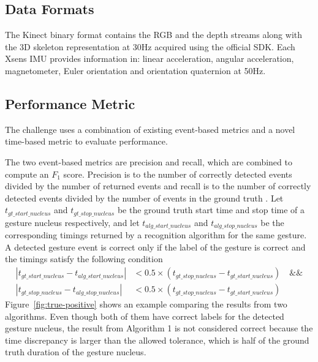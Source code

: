 \subsection{Data Formats}
The Kinect binary format contains the RGB and the depth streams along with the
3D skeleton representation at 30Hz acquired using the official SDK. Each Xsens IMU
provides information in: linear acceleration, angular acceleration,
magnetometer, Euler orientation and orientation quaternion at 50Hz.

\subsection{Performance Metric}\label{sec:chairgest-metric}
The challenge uses a combination of existing event-based metrics and a novel
time-based metric to evaluate performance. 

The two event-based metrics are
precision and recall, which are combined to compute an $F_1$ score. Precision is
to the number of correctly detected events divided by the number of returned events and recall 
is to the number of correctly detected events divided by the number of
events in the ground truth \cite{Ruffieux2013}. Let
$t_{gt\_start\_nucleus}$ and $t_{gt\_stop\_nucleus}$ be the ground truth start time and stop time of a gesture nucleus respectively,
and let $t_{alg\_start\_nucleus}$ and $t_{alg\_stop\_nucleus}$ be the
corresponding timings returned by a recognition algorithm for the same gesture.
A detected gesture event is correct only if the label of the gesture is
correct and the timings satisfy the following condition
\begin{align*}
|t_{gt\_start\_nucleus} - t_{alg\_start\_nucleus}| &< 0.5\times
(t_{gt\_stop\_nucleus} - t_{gt\_start\_nucleus}) \quad \text{\&\&} \\
|t_{gt\_stop\_nucleus} - t_{alg\_stop\_nucleus}| &< 0.5\times
(t_{gt\_stop\_nucleus} - t_{gt\_start\_nucleus})
\end{align*}
Figure~\ref{fig:true-positive} shows an example comparing the results from two
algorithms. Even though both of them have correct labels for the detected
gesture nucleus, the result from Algorithm 1 is not considered correct because
the time discrepancy is larger than the allowed tolerance, which is half of the
ground truth duration of the gesture nucleus.

